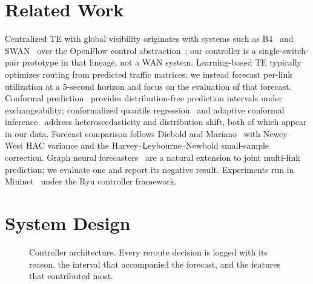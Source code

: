 \documentclass[conference]{IEEEtran}
\begin{document}
\section{Related Work}
Centralized TE with global visibility originates with systems such as
B4~\cite{jain2013b4} and SWAN~\cite{hong2013swan} over the OpenFlow
control abstraction~\cite{mckeown2008openflow}; our controller is a
single-switch-pair prototype in that lineage, not a WAN system.
Learning-based TE typically optimizes routing from predicted traffic
matrices; we instead forecast per-link utilization at a 5-second
horizon and focus on the evaluation of that forecast. Conformal
prediction~\cite{lei2018distributionfree} provides
distribution-free prediction intervals under exchangeability;
conformalized quantile regression~\cite{romano2019conformalized} and
adaptive conformal inference~\cite{gibbs2021adaptive} address
heteroscedasticity and distribution shift, both of which appear in
our data. Forecast comparison follows Diebold and
Mariano~\cite{diebold1995comparing} with Newey--West HAC variance and
the Harvey--Leybourne--Newbold small-sample correction. Graph neural
forecasters~\cite{kipf2017gcn} are a natural extension to joint
multi-link prediction; we evaluate one and report its negative
result. Experiments run in Mininet~\cite{lantz2010mininet} under the
Ryu controller framework.

\section{System Design}

\begin{figure}[t]
\centering
{}
\caption{Controller architecture. Every reroute decision is logged
with its reason, the interval that accompanied the forecast, and the
features that contributed most.}
\label{fig:arch}
\end{figure}
\end{document}
